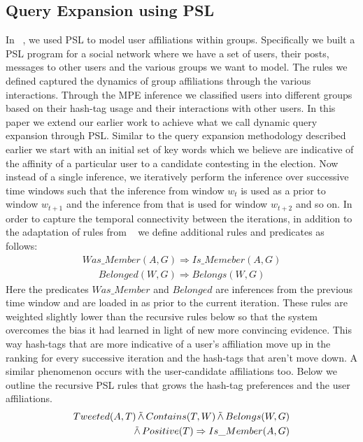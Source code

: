 \subsection{Query Expansion using PSL}
In ~\cite{huang2012social}, we used PSL to model user affiliations within groups. 
Specifically we built a PSL program for a  social network where we have a set of users, their posts, messages to other users and the various groups we want to model. 
The rules we defined captured the dynamics of group affiliations through the various interactions.
Through the MPE inference we classified users into different groups based on their hash-tag usage and their interactions with other users.
\newline
In this paper we extend our earlier work to achieve what we call dynamic query expansion through PSL. 
Similar to the query expansion methodology described earlier we start with an initial set of key words which we believe are indicative of the affinity of a particular user to a candidate contesting in the election.
Now instead of a single inference, we iteratively perform the inference over successive time windows such that the inference from window $w_t$ is used as a prior to window $w_{t+1}$ and the inference from that is used for window $w_{t+2}$ and so on.
In order to capture the temporal connectivity between the iterations, in addition to the adaptation of rules from ~\cite{huang2012social} we define additional rules and predicates as follows:
\begin{align*}
Was\_Member(A,G) \Rightarrow Is\_Memeber(A,G)
\end{align*}
\begin{align*}
Belonged(W,G) \Rightarrow Belongs(W,G)
\end{align*}
Here the predicates $Was\_Member$ and $Belonged$ are inferences from the previous time window and are loaded in as  prior to the current iteration.
These rules are weighted slightly lower than the recursive rules below so that the system overcomes the bias it had learned in light of new more convincing evidence.
This way hash-tags that are more indicative of a user's affiliation move up in the ranking for every successive iteration and the hash-tags that aren't move down.
A similar phenomenon occurs with the user-candidate affiliations too.
Below we outline the recursive PSL rules that grows the hash-tag preferences and the user affiliations. 
\begin{align*}
\begin{split}
Tweeted(A,T) 
	\softand Contains(T,W)
	\softand Belongs(W,G) \\ 
	\softand Positive(T)
	\Rightarrow Is\_Member(A,G)
\end{split}
\end{align*}

